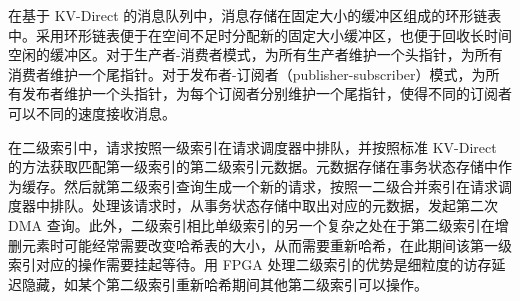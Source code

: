 在基于 KV-Direct 的消息队列中，消息存储在固定大小的缓冲区组成的环形链表中。采用环形链表便于在空间不足时分配新的固定大小缓冲区，也便于回收长时间空闲的缓冲区。对于生产者-消费者模式，为所有生产者维护一个头指针，为所有消费者维护一个尾指针。对于发布者-订阅者（publisher-subscriber）模式，为所有发布者维护一个头指针，为每个订阅者分别维护一个尾指针，使得不同的订阅者可以不同的速度接收消息。

在二级索引中，请求按照一级索引在请求调度器中排队，并按照标准 KV-Direct 的方法获取匹配第一级索引的第二级索引元数据。元数据存储在事务状态存储中作为缓存。然后就第二级索引查询生成一个新的请求，按照一二级合并索引在请求调度器中排队。处理该请求时，从事务状态存储中取出对应的元数据，发起第二次 DMA 查询。此外，二级索引相比单级索引的另一个复杂之处在于第二级索引在增删元素时可能经常需要改变哈希表的大小，从而需要重新哈希，在此期间该第一级索引对应的操作需要挂起等待。用 FPGA 处理二级索引的优势是细粒度的访存延迟隐藏，如某个第二级索引重新哈希期间其他第二级索引可以操作。